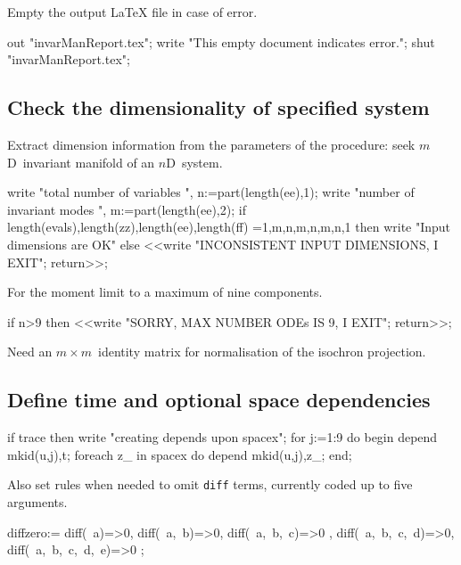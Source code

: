 \documentclass[11pt,a5paper]{article}
\begin{document}
Empty the output LaTeX file in case of error.
\begin{reduce}
out "invarManReport.tex";
write "This empty document indicates error.";
shut "invarManReport.tex";
\end{reduce}


 


\subsection{Check the dimensionality of specified system}
Extract dimension information from the parameters of the
procedure: seek $m$D~invariant manifold of an $n$D~system.
\begin{reduce}
write "total number of variables ",
n:=part(length(ee),1);
write "number of invariant modes ",
m:=part(length(ee),2);
if {length(evals),length(zz),length(ee),length(ff)}
  ={{1,m},{n,m},{n,m},{n,1}} 
  then write "Input dimensions are OK" 
  else <<write "INCONSISTENT INPUT DIMENSIONS, I EXIT"; 
      return>>;
\end{reduce}

For the moment limit to a maximum of nine components.
\begin{reduce}
if n>9 then <<write "SORRY, MAX NUMBER ODEs IS 9, I EXIT"; 
    return>>;
\end{reduce}

Need an \(m\times m\)~identity matrix for normalisation of
the isochron projection.



\subsection{Define time and optional space dependencies}
\begin{reduce}
if trace then write "creating depends upon spacex";
for j:=1:9 do begin
    depend mkid(u,j),t;
    foreach z_ in spacex do depend mkid(u,j),z_;
end;
\end{reduce}
Also set rules when needed to omit \verb|diff| terms,
currently coded up to five arguments.
\begin{reduce}
diffzero:={ diff(~a)=>0, diff(~a,~b)=>0, diff(~a,~b,~c)=>0
    , diff(~a,~b,~c,~d)=>0, diff(~a,~b,~c,~d,~e)=>0 };
\end{reduce}
\end{document}
